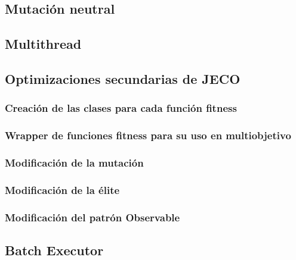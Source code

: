 \subsection{Mutación neutral}

\subsection{Multithread}

\subsection{Optimizaciones secundarias de JECO}

\subsubsection{Creación de las clases para cada función fitness}

\subsubsection{Wrapper de funciones fitness para su uso en multiobjetivo}

\subsubsection{Modificación de la mutación}

\subsubsection{Modificación de la élite}

\subsubsection{Modificación del patrón Observable}

\subsection{Batch Executor}


